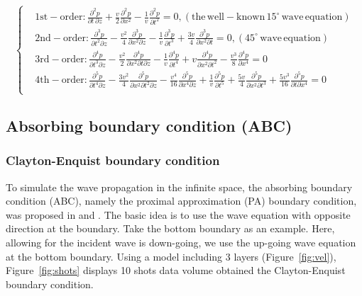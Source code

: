 \begin{equation}\left\{
\begin{split}
&\mathrm{1st-order:}
\frac{\partial^2 p}{\partial t\,\partial z}+\frac{v}{2}\frac{\partial^2 p}{\partial x^2}
-\frac{1}{v}\frac{\partial^2 p}{\partial t^2}=0, \mathrm{(the \, well-known\, 15^{\circ}\, wave\, equation)}\\
&\mathrm{2nd-order:}
\frac{\partial^3 p}{\partial t^2\partial z}-\frac{v^2}{4}\frac{\partial^3 p}{\partial x^2\partial z}-\frac{1}{v}\frac{\partial^3 p}{\partial t^3}+\frac{3v}{4}\frac{\partial^3 p}{\partial x^2\partial t}=0,  \mathrm{(45^{\circ}\, wave\, equation)}\\
&\mathrm{3rd-order:}
\frac{\partial^4 p}{\partial t^3\partial z}-\frac{v^2}{2}\frac{\partial^4 p}{\partial x^2\partial t\partial z}-\frac{1}{v}\frac{\partial^4 p}{\partial t^4}+v\frac{\partial^4 p}{\partial x^2\partial t^2}-\frac{v^3}{8}\frac{\partial^4 p}{\partial x^4}=0\\
&\mathrm{4th-order:}
\frac{\partial^5 p}{\partial t^4\partial z}-\frac{3v^2}{4}\frac{\partial^5 p}{\partial x^2\partial t^2\partial z}-\frac{v^4}{16}\frac{\partial^5 p}{\partial x^4\partial z}
+\frac{1}{v}\frac{\partial^5 p}{\partial t^5}
+\frac{5v}{4}\frac{\partial^5 p}{\partial x^2\partial t^3}+\frac{5v^3}{16}\frac{\partial^5 p}{\partial t\partial x^4}=0\\
\end{split}\right.
\end{equation}

\subsection{Absorbing boundary condition (ABC)}

\subsubsection{Clayton-Enquist boundary condition}

To simulate the wave propagation in the infinite space, the absorbing boundary condition (ABC), namely the proximal approximation (PA) boundary condition,  was proposed in \cite{clayton1977absorbing} and \cite{engquist1977absorbing}. The basic idea is to use the wave equation with opposite direction at the boundary. Take the bottom boundary as an example. Here, allowing for the incident wave is down-going, we use the up-going wave equation at the bottom boundary. Using a model including 3 layers (Figure~\ref{fig:vel}), Figure~\ref{fig:shots} displays 10 shots data volume obtained the Clayton-Enquist boundary condition.

